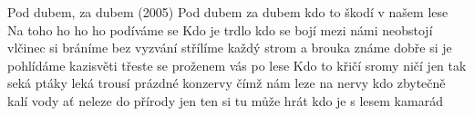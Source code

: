 \begin{TEXT}{Pod dubem, za dubem (2005)}
\REFREN Pod dubem za dubem
kdo to škodí v našem lese
Na toho ho ho ho podíváme se
\SLOKA Kdo je trdlo kdo se bojí mezi námi neobstojí
vlčinec si bráníme bez vyzvání střílíme
každý strom a brouka známe dobře si je pohlídáme
kazisvěti třeste se proženem vás po lese
\SLOKA Kdo to křičí sromy ničí jen tak seká ptáky leká
trousí prázdné konzervy čímž nám leze na nervy
kdo zbytečně kalí vody ať neleze do přírody
jen ten si tu může hrát kdo je s lesem kamarád
\end{TEXT}
